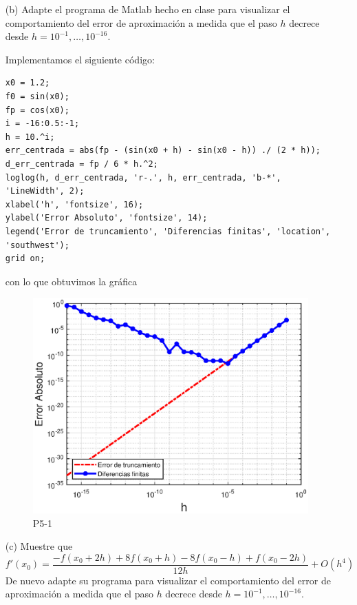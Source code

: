 \documentclass[12pt, a4paper]{article}%
\begin{document}
\begin{itemize}
    \item[(b)] Adapte el programa de Matlab hecho en clase para visualizar el comportamiento del error de aproximación a medida que el paso \( h \) decrece desde \( h = 10^{-1}, \dots, 10^{-16} \).

\begin{solution}
        Implementamos el siguiente código:

    \begin{verbatim}
x0 = 1.2;       
f0 = sin(x0);       
fp = cos(x0);     
i = -16:0.5:-1;
h = 10.^i;
err_centrada = abs(fp - (sin(x0 + h) - sin(x0 - h)) ./ (2 * h));
d_err_centrada = fp / 6 * h.^2;
loglog(h, d_err_centrada, 'r-.', h, err_centrada, 'b-*', 'LineWidth', 2);
xlabel('h', 'fontsize', 16);
ylabel('Error Absoluto', 'fontsize', 14);
legend('Error de truncamiento', 'Diferencias finitas', 'location', 'southwest');
grid on;
\end{verbatim}

con lo que obtuvimos la gráfica

\begin{figure}[H]
    \centering
    \includegraphics[width=0.75\linewidth]{Gráficas/P5-1.eps}
    \caption{P5-1}
    \label{fig:bluelabel}
\end{figure}
    
\end{solution}

    \item[(c)] Muestre que
    \[
    f'(x_0) = \dfrac{-f(x_0 + 2h) + 8f(x_0 + h) - 8f(x_0 - h) + f(x_0 - 2h)}{12h} + O(h^4)
    \]
    De nuevo adapte su programa para visualizar el comportamiento del error de aproximación a medida que el paso \( h \) decrece desde \( h = 10^{-1}, \dots, 10^{-16} \).
\end{itemize}
\end{document}
